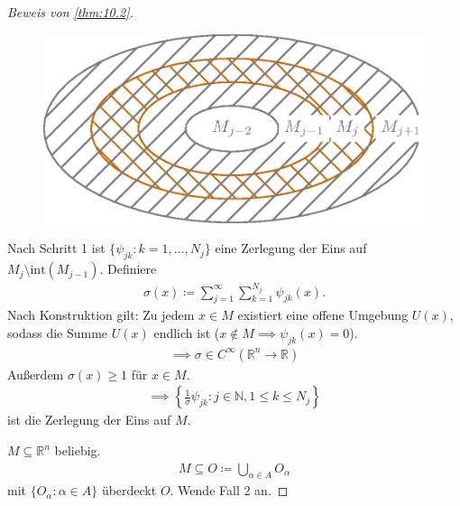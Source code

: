 \documentclass[a4paper,10pt]{scrbook}
\begin{document}
\begin{proof}[Beweis von \ref{thm:10.2}]
  \begin{figure}[H]
    \centering
    \includegraphics[scale=0.2]{images/ana3-tmp-78}
  \end{figure}

  Nach Schritt 1 ist $\{ \psi_{jk} : k = 1,\ldots,N_j \}$ eine Zerlegung der Eins auf $M_j \setminus \mathrm{int}(M_{j-1})$. Definiere
  \begin{align*}
    \sigma(x) \coloneq \sum\limits_{j=1}^{\infty} \sum\limits_{k=1}^{N_j} \psi_{jk}(x).
  \end{align*}
  Nach Konstruktion gilt: Zu jedem $x \in M$ existiert eine offene Umgebung $U(x)$, sodass die Summe $U(x)$ endlich ist ($x \notin M \implies \psi_{jk}(x) = 0$).
  \begin{align*}
    \implies \sigma \in C^\infty(\mathbb{R}^n \to \mathbb{R})
  \end{align*}
  Außerdem $\sigma(x) \geq 1$ für $x \in M$.
  \begin{align*}
    \implies \left\{ \frac{1}{\sigma} \psi_{jk} : j \in \mathbb{N}, 1 \leq k \leq N_j \right\}
  \end{align*}
  ist die Zerlegung der Eins auf $M$.

   $M \subseteq \mathbb{R}^n$ beliebig.
  \begin{align*}
    M \subseteq O \coloneq \bigcup\limits_{\alpha \in A} O_\alpha
  \end{align*}
  mit $\{ O_\alpha : \alpha \in A \}$ überdeckt $O$. Wende Fall 2 an.
\end{proof}

%
%
\end{document}
